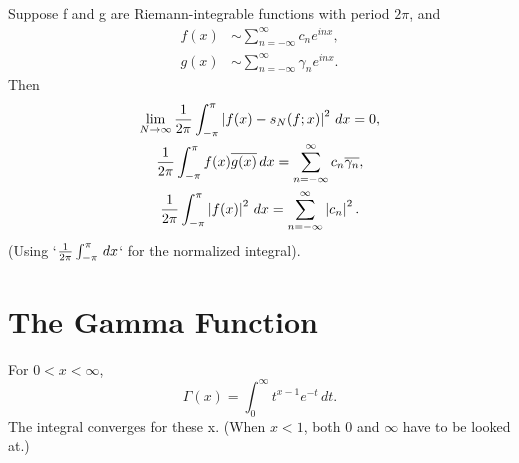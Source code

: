 \begin{theorem} %
  \label{thm:chap8:parsevals_theorem}
  Suppose f and g are Riemann-integrable functions with period $2\pi$, and
  \begin{align}
    f(x) &\sim \sum_{n=-\infty}^\infty c_n e^{inx},
    \label{eq:chap8:f_fourier} \\
    g(x) &\sim \sum_{n=-\infty}^\infty \gamma_n e^{inx}.
    \label{eq:chap8:g_fourier}
  \end{align}
  Then
  \begin{gather}
    \lim_{N \to \infty} \frac{1}{2\pi} \int_{-\pi}^{\pi} \left\lvert f(x) - s_N(f; x) \right\rvert^2 \, dx = 0,
    \label{eq:chap8:mean_sq_conv} \\
    \frac{1}{2\pi} \int_{-\pi}^{\pi} f(x) \overline{g(x)} \, dx =
    \sum_{n=-\infty}^\infty c_n \overline{\gamma_n},
    \label{eq:chap8:parseval_fg} \\
    \frac{1}{2\pi} \int_{-\pi}^{\pi} \left\lvert f(x) \right\rvert^2 \, dx =
    \sum_{n=-\infty}^\infty \left\lvert c_n \right\rvert^2. \label{eq:chap8:parseval_ff}
  \end{gather}
  (Using `$\frac{1}{2\pi} \int_{-\pi}^{\pi}  \, dx$` for the normalized integral).
\end{theorem}


\section{The Gamma Function}
\label{sec:chap8:gamma_function}


\begin{definition} %
  \label{def:chap8:gamma_function}
  For $0 < x < \infty$,
  \begin{equation} \label{eq:chap8:gamma_def}
    \Gamma(x) = \int_0^\infty t^{x-1} e^{-t} \, dt.
  \end{equation}
  The integral converges for these x. (When $x<1$, both 0 and
  $\infty$ have to be looked at.)
\end{definition}

